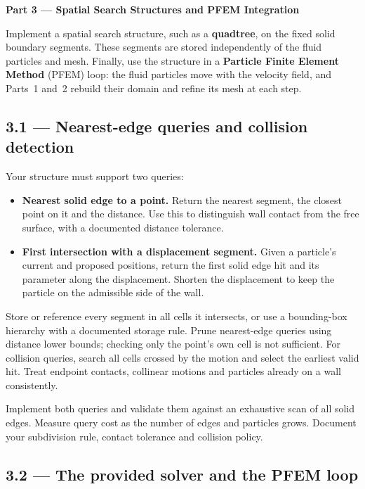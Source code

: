 \documentclass[11pt,a4paper]{article}
\newcommand{\homeworkpart}[2]{%
  \vspace{0.6em}
  \begin{tcolorbox}[colback=navy,colframe=navy,arc=0pt,boxrule=0pt,
    left=10pt,right=10pt,top=7pt,bottom=7pt]
    {\color{white}\bfseries\large Part #1 --- #2}
  \end{tcolorbox}
  \vspace{0.4em}
}
\begin{document}
\homeworkpart{3}{Spatial Search Structures and PFEM Integration}

Implement a spatial search structure, such as a \textbf{quadtree}, on the
fixed solid boundary segments. These segments are stored independently of
the fluid particles and mesh. Finally, use the structure in a
\textbf{Particle Finite Element Method} (PFEM) loop: the fluid particles
move with the velocity field, and Parts~1 and~2 rebuild their domain and
refine its mesh at each step.

\subsection*{3.1 --- Nearest-edge queries and collision detection}

Your structure must support two queries:
\begin{itemize}[leftmargin=1.4em]
  \item \textbf{Nearest solid edge to a point.} Return the nearest segment,
    the closest point on it and the distance. Use this to distinguish wall
    contact from the free surface, with a documented distance tolerance.
  \item \textbf{First intersection with a displacement segment.} Given a
    particle's current and proposed positions, return the first solid edge
    hit and its parameter along the displacement. Shorten the displacement
    to keep the particle on the admissible side of the wall.
\end{itemize}
Store or reference every segment in all cells it intersects, or use a
bounding-box hierarchy with a documented storage rule. Prune nearest-edge
queries using distance lower bounds; checking only the point's own cell is
not sufficient. For collision queries, search all cells crossed by the
motion and select the earliest valid hit. Treat endpoint contacts,
collinear motions and particles already on a wall consistently.

\begin{task}
Implement both queries and validate them against an exhaustive scan of all
solid edges. Measure query cost as the number of edges and particles grows.
Document your subdivision rule, contact tolerance and collision policy.
\end{task}

\subsection*{3.2 --- The provided solver and the PFEM loop}
\end{document}

